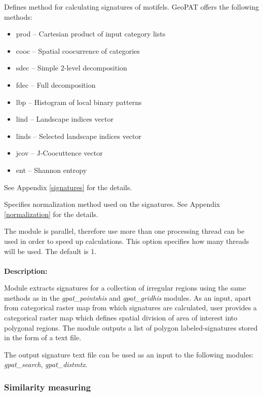 
Defines method for calculating signatures of motifels. 
GeoPAT offers the following methods: 
\begin{itemize}
	\item prod -- Cartesian product of input category lists
	\item cooc -- Spatial coocurrence of categories
	\item sdec -- Simple 2-level decomposition
	\item fdec -- Full decomposition
	\item lbp -- Histogram of local binary patterns
	\item lind -- Landscape indices vector
	\item linds -- Selected landscape indices vector
	\item jcov -- J-Coocuttence vector
	\item ent -- Shannon entropy
\end{itemize}
See Appendix \ref{signatures} for the details.


Specifies normalization method used on the signatures. 
See Appendix \ref{normalization} for the details.


The module is parallel, therefore use more than one processing thread can be used in order to speed up calculations. 
This option specifies how many threads will be used. 
The default is 1.
\\\\
{\bf Description:}

Module extracts signatures for a collection of irregular regions using the same methods as in the {\it gpat\_pointshis} and {\it gpat\_gridhis} modules. 
As an input, apart from categorical raster map from which signatures are calculated, user provides a categorical raster map which defines spatial division of area of interest into polygonal regions. 
The module outputs a list of polygon labeled-signatures stored in the form of a text file. 

The output signature text file can be used as an input to the following modules: {\it gpat\_search}, {\it gpat\_distmtx}.

\subsubsection{Similarity measuring}

